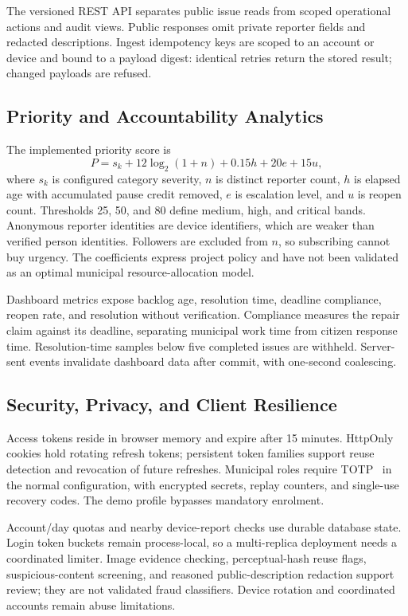 \documentclass[conference,a4paper]{IEEEtran}
\begin{document}
The versioned REST API separates public issue reads from scoped operational actions and audit views. Public responses omit private reporter fields and redacted descriptions. Ingest idempotency keys are scoped to an account or device and bound to a payload digest: identical retries return the stored result; changed payloads are refused.

\subsection{Priority and Accountability Analytics}
The implemented priority score is
\begin{equation}
 P=s_k+12\log_2(1+n)+0.15h+20e+15u,
 \label{eq:priority}
\end{equation}
where $s_k$ is configured category severity, $n$ is distinct reporter count, $h$ is elapsed age with accumulated pause credit removed, $e$ is escalation level, and $u$ is reopen count. Thresholds 25, 50, and 80 define medium, high, and critical bands. Anonymous reporter identities are device identifiers, which are weaker than verified person identities. Followers are excluded from $n$, so subscribing cannot buy urgency. The coefficients express project policy and have not been validated as an optimal municipal resource-allocation model.

Dashboard metrics expose backlog age, resolution time, deadline compliance, reopen rate, and resolution without verification. Compliance measures the repair claim against its deadline, separating municipal work time from citizen response time. Resolution-time samples below five completed issues are withheld. Server-sent events invalidate dashboard data after commit, with one-second coalescing.

\subsection{Security, Privacy, and Client Resilience}
Access tokens reside in browser memory and expire after 15 minutes. HttpOnly cookies hold rotating refresh tokens; persistent token families support reuse detection and revocation of future refreshes. Municipal roles require TOTP~\cite{totp} in the normal configuration, with encrypted secrets, replay counters, and single-use recovery codes. The demo profile bypasses mandatory enrolment.

Account/day quotas and nearby device-report checks use durable database state. Login token buckets remain process-local, so a multi-replica deployment needs a coordinated limiter. Image evidence checking, perceptual-hash reuse flags, suspicious-content screening, and reasoned public-description redaction support review; they are not validated fraud classifiers. Device rotation and coordinated accounts remain abuse limitations.
\end{document}
